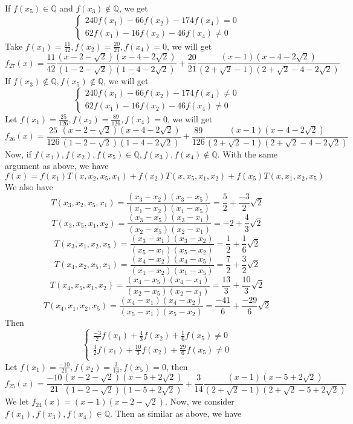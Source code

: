\documentclass[english, 10pt]{article} %
\begin{document}
If $f(x_5) \in \mathbb{Q}$ and $f(x_3) \not \in \mathbb{Q}$, we get
$$\begin{cases}
240f(x_1)-66f(x_2)-174f(x_4)=0\\
62f(x_1)-16f(x_2)-46f(x_4) \neq 0
\end{cases}$$
Take $f(x_1) = \frac{11}{42}, f(x_2)=\frac{20}{21}, f(x_4) = 0$, we will get
$$f_{27}(x) = \frac{11}{42}\frac{(x-2-\sqrt{2})(x-4-2\sqrt{2})}{(1-2-\sqrt{2})(1-4-2\sqrt{2})}+\frac{20}{21}\frac{(x-1)(x-4-2\sqrt{2})}{(2+\sqrt{2}-1)(2+\sqrt{2}-4-2\sqrt{2})}$$
If $f(x_3) \not \in \mathbb{Q}, f(x_5) \not \in \mathbb{Q}$, we will get
$$\begin{cases}
240f(x_1)-66f(x_2)-174f(x_4) \neq 0\\
62f(x_1)-16f(x_2)-46f(x_4) \neq 0
\end{cases}$$
Let $f(x_1)=\frac{25}{126}, f(x_2)=\frac{89}{126}, f(x_4)=0$, we will get
$$f_{26}(x) = \frac{25}{126}\frac{(x-2-\sqrt{2})(x-4-2\sqrt{2})}{(1-2-\sqrt{2})(1-4-2\sqrt{2})}+\frac{89}{126}\frac{(x-1)(x-4-2\sqrt{2})}{(2+\sqrt{2}-1)(2+\sqrt{2}-4-2\sqrt{2})}$$
Now, if $f(x_1),f(x_2),f(x_5) \in \mathbb{Q}, f(x_3), f(x_4) \not \in \mathbb{Q}$. With the same argument as above, we have
$$f(x) = f(x_1)T(x,x_2,x_5,x_1)+f(x_2)T(x,x_5,x_1,x_2)+f(x_5)T(x,x_1,x_2,x_5)$$
We also have
$$T(x_3,x_2,x_5,x_1) = \frac{(x_3-x_2)(x_3-x_5)}{(x_1-x_2)(x_1-x_5)} = \frac{5}{2}+\frac{-3}{2}\sqrt{2}$$
$$T(x_3,x_5,x_1,x_2) = \frac{(x_3-x_5)(x_3-x_1)}{(x_2-x_5)(x_2-x_1)} = -2+\frac{4}{3}\sqrt{2}$$
$$T(x_3,x_1,x_2,x_5) = \frac{(x_3-x_1)(x_3-x_2)}{(x_5-x_1)(x_5-x_2)}= \frac{1}{2}+\frac{1}{6}\sqrt{2}$$
$$T(x_4,x_2,x_5,x_1) = \frac{(x_4-x_2)(x_4-x_5)}{(x_1-x_2)(x_1-x_5)} = \frac{7}{2}+\frac{3}{2}\sqrt{2}$$
$$T(x_4,x_5,x_1,x_2) = \frac{(x_4-x_5)(x_4-x_1)}{(x_2-x_5)(x_2-x_1)} = \frac{13}{3}+\frac{10}{3}\sqrt{2}$$
$$T(x_4,x_1,x_2,x_5) = \frac{(x_4-x_1)(x_4-x_2)}{(x_5-x_1)(x_5-x_2)}= \frac{-41}{6}+\frac{-29}{6}\sqrt{2}$$
Then
$$\begin{cases}
\frac{-3}{2}f(x_1)+\frac{4}{3}f(x_2)+\frac{1}{6}f(x_5) \neq 0\\
\frac{3}{2}f(x_1)+\frac{10}{3}f(x_2)+\frac{29}{6}f(x_5) \neq 0\\
\end{cases}$$
Let $f(x_1) = \frac{-10}{21}, f(x_2) = \frac{3}{14}, f(x_5)=0$, then
$$f_{25}(x) = \frac{-10}{21} \frac{(x-2-\sqrt{2})(x-5+2\sqrt{2})}{(1-2-\sqrt{2})(1-5+2\sqrt{2})} + \frac{3}{14}\frac{(x-1)(x-5+2\sqrt{2})}{(2+\sqrt{2}-1)(2+\sqrt{2}-5+2\sqrt{2})}$$
We let $f_{24}(x) = (x-1)(x-2-\sqrt{2})$. Now, we consider $f(x_1),f(x_3),f(x_4) \in \mathbb{Q}$. Then as similar as above, we have
\end{document}
